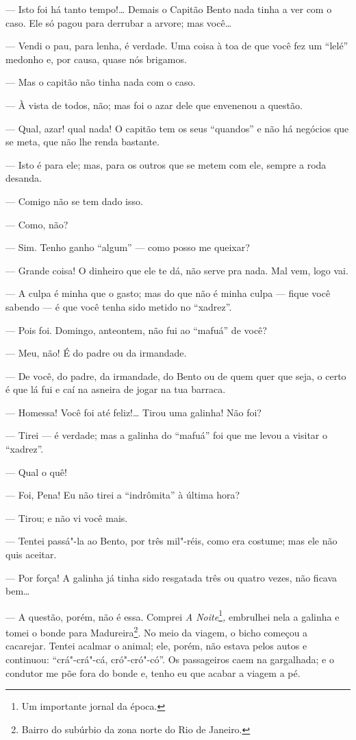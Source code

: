 --- Isto foi há tanto tempo!\ldots{} Demais o Capitão Bento nada tinha a ver
com o caso. Ele só pagou para derrubar a arvore; mas você\ldots{}

--- Vendi o pau, para lenha, é verdade. Uma coisa à toa de que você fez
um ``lelé'' medonho e, por causa, quase nós brigamos.

--- Mas o capitão não tinha nada com o caso.

--- À vista de todos, não; mas foi o azar dele que envenenou a questão.

--- Qual, azar! qual nada! O capitão tem os seus ``quandos'' e não há
negócios que se meta, que não lhe renda bastante.

--- Isto é para ele; mas, para os outros que se metem com ele, sempre a
roda desanda.

--- Comigo não se tem dado isso.

--- Como, não?

--- Sim. Tenho ganho ``algum'' --- como posso me queixar?

--- Grande coisa! O dinheiro que ele te dá, não serve pra nada. Mal vem,
logo vai.

--- A culpa é minha que o gasto; mas do que não é minha culpa --- fique
você sabendo --- é que você tenha sido metido no ``xadrez''.

--- Pois foi. Domingo, anteontem, não fui ao ``mafuá'' de você?

--- Meu, não! É do padre ou da irmandade.

--- De você, do padre, da irmandade, do Bento ou de quem quer que seja, o
certo é que lá fui e caí na asneira de jogar na tua barraca.

--- Homessa! Você foi até feliz!\ldots{} Tirou uma galinha! Não foi?

--- Tirei --- é verdade; mas a galinha do ``mafuá'' foi que me levou a
visitar o ``xadrez''.

--- Qual o quê!

--- Foi, Pena! Eu não tirei a ``indrômita'' à última hora?

--- Tirou; e não vi você mais.

--- Tentei passá"-la ao Bento, por três mil"-réis, como era costume; mas
ele não quis aceitar.

--- Por força! A galinha já tinha sido resgatada três ou quatro vezes,
não ficava bem\ldots{}

--- A questão, porém, não é essa. Comprei \emph{A Noite}\footnote{Um
  importante jornal da época.}\emph{,} embrulhei nela a galinha e tomei
o bonde para Madureira\footnote{Bairro do subúrbio da zona norte do Rio
  de Janeiro.}. No meio da viagem, o bicho começou a cacarejar. Tentei
acalmar o animal; ele, porém, não estava pelos autos e continuou:
``crá"-crá"-cá, cró"-cró"-có''. Os passageiros caem na gargalhada; e o
condutor me põe fora do bonde e, tenho eu que acabar a viagem a pé.

